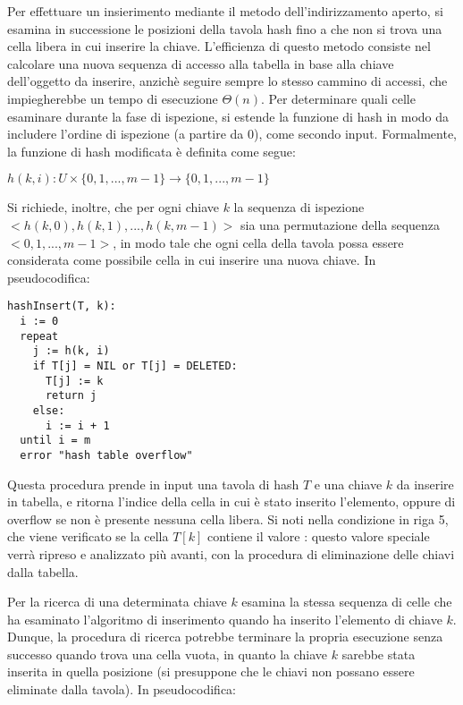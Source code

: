 Per effettuare un insierimento mediante il metodo dell'indirizzamento aperto, si esamina in successione le posizioni della tavola hash fino a che non si trova una cella libera in cui inserire la chiave. L'efficienza di questo metodo consiste nel calcolare una nuova sequenza di accesso alla tabella in base alla chiave dell'oggetto da inserire, anzichè seguire sempre lo stesso cammino di accessi, che impiegherebbe un tempo di esecuzione \(\Theta(n)\). Per determinare quali celle esaminare durante la fase di ispezione, si estende la funzione di hash in modo da includere l'ordine di ispezione (a partire da 0), come secondo input. Formalmente, la funzione di hash modificata è definita come segue:

\(h(k,i):U\times \{0,1,...,m-1\} \to \{0,1,...,m-1\}\)

\noindent Si richiede, inoltre, che per ogni chiave \(k\) la sequenza di ispezione \(<h(k,0), h(k,1),..., h(k,m-1)>\) sia una permutazione della sequenza \(<0,1,...,m-1>\), in modo tale che ogni cella della tavola possa essere considerata come possibile cella in cui inserire una nuova chiave. In pseudocodifica:

\begin{lstlisting}
hashInsert(T, k):
  i := 0
  repeat
    j := h(k, i)
    if T[j] = NIL or T[j] = DELETED:
      T[j] := k
      return j
    else:
      i := i + 1
  until i = m
  error "hash table overflow"
\end{lstlisting}

Questa procedura prende in input una tavola di hash \(T\) e una chiave \(k\) da inserire in tabella, e ritorna l'indice della cella in cui è stato inserito l'elemento, oppure  di overflow se non è presente nessuna cella libera. Si noti nella condizione in riga 5, che viene verificato se la cella \(T[k]\) contiene il valore : questo valore speciale verrà ripreso e analizzato più avanti, con la procedura di eliminazione delle chiavi dalla tabella.

\vspace{10pt}

Per la ricerca di una determinata chiave \(k\) esamina la stessa sequenza di celle che ha esaminato l'algoritmo di inserimento quando ha inserito l'elemento di chiave \(k\). Dunque, la procedura di ricerca potrebbe terminare la propria esecuzione senza successo quando trova una cella vuota, in quanto la chiave \(k\) sarebbe stata inserita in quella posizione (si presuppone che le chiavi non possano essere eliminate dalla tavola). In pseudocodifica:

